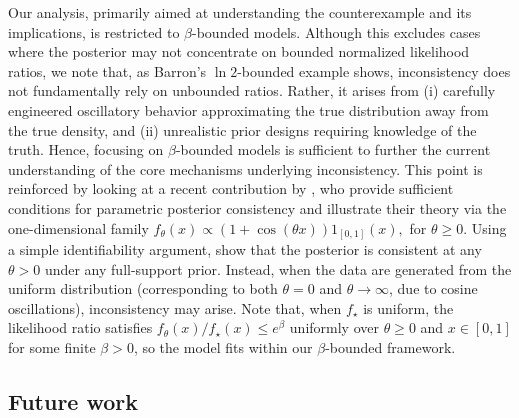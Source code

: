\documentclass[11pt,twoside]{article}
\begin{document}
Our analysis, primarily aimed at understanding the counterexample and its implications, is restricted to $\beta$-bounded models. Although this excludes cases where the posterior may not concentrate on bounded normalized likelihood ratios, we note that, as Barron’s $\ln 2$-bounded example shows, inconsistency does not fundamentally rely on unbounded ratios. Rather, it arises from (i) carefully engineered oscillatory behavior approximating the true distribution away from the true density, and (ii) unrealistic prior designs requiring knowledge of the truth. Hence, focusing on $\beta$-bounded models is sufficient to further the current understanding of the core mechanisms underlying inconsistency. This point is reinforced by looking at a recent contribution by \cite{bariletto2025identifiability}, who provide sufficient conditions for parametric posterior consistency and illustrate their theory via the one-dimensional family $f_\theta(x)\propto(1+\cos(\theta x))1_{[0,1]}(x),$ for $\theta\geq 0.$ Using a simple identifiability argument, \cite{bariletto2025identifiability} show that the posterior is consistent at any $\theta>0$ under any full-support prior. Instead, when the data are generated from the uniform distribution (corresponding to both $\theta=0$ and $\theta\to\infty$, due to cosine oscillations), inconsistency may arise. Note that, when $f_\star$ is uniform, the likelihood ratio satisfies $f_\theta(x)/f_\star(x)\leq e^\beta$ uniformly over $\theta\geq 0$ and $x\in[0,1]$ for some finite $\beta>0$, so the model fits within our $\beta$-bounded framework.

\subsection{Future work}
\end{document}
